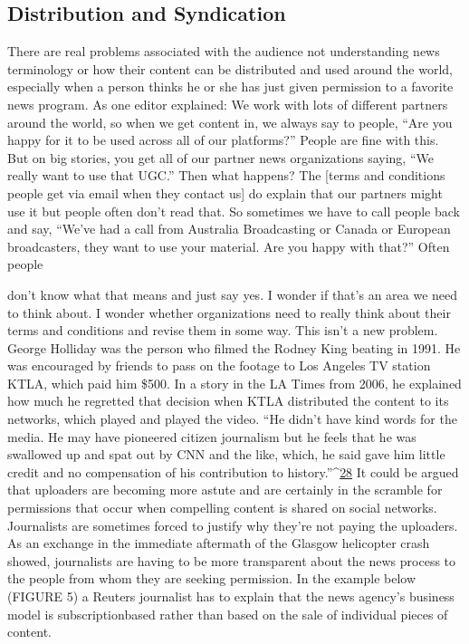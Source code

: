 \begin{enumerate}
\section{Distribution and Syndication}
There are real problems associated with the audience not understanding
news terminology or how their content can be distributed and used around
the world, especially when a person thinks he or she has just given permission
to a favorite news program. As one editor explained:
We work with lots of different partners around the world, so when
we get content in, we always say to people, ``Are you happy for it to
be used across all of our platforms?'' People are fine with this. But on
big stories, you get all of our partner news organizations saying, ``We
really want to use that UGC.'' Then what happens? The [terms and
conditions people get via email when they contact us] do explain that
our partners might use it but people often don't read that. So sometimes
we have to call people back and say, ``We've had a call from
Australia Broadcasting or Canada or European broadcasters, they
want to use your material. Are you happy with that?'' Often people

don't know what that means and just say yes. I wonder if that's an
area we need to think about. I wonder whether organizations need
to really think about their terms and conditions and revise them in
some way.
This isn't a new problem. George Holliday was the person who filmed the
Rodney King beating in 1991. He was encouraged by friends to pass on the
footage to Los Angeles TV station KTLA, which paid him \$500. In a story
in the LA Times from 2006, he explained how much he regretted that decision
when KTLA distributed the content to its networks, which played and
played the video. ``He didn't have kind words for the media. He may have
pioneered citizen journalism but he feels that he was swallowed up and spat
out by CNN and the like, which, he said gave him little credit and no compensation
of his contribution to history.''^{\href{#endnotes}{28}}
It could be argued that uploaders are becoming more astute and are certainly
in the scramble for permissions that occur when compelling content
is shared on social networks. Journalists are sometimes forced to justify
why they're not paying the uploaders. As an exchange in the immediate
aftermath of the Glasgow helicopter crash showed, journalists are having to
be more transparent about the news process to the people from whom they
are seeking permission. In the example below (FIGURE 5) a Reuters journalist
has to explain that the news agency's business model is subscriptionbased
rather than based on the sale of individual pieces of content.


\end{enumerate}
